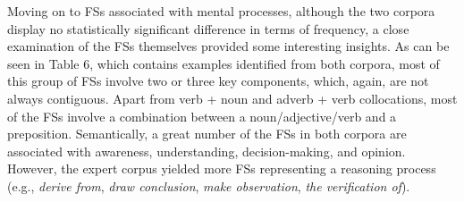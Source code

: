 \begin{styleStandard}
Moving on to FSs associated with mental processes, although the two corpora display no statistically significant difference in terms of frequency, a close examination of the FSs themselves provided some interesting insights. As can be seen in Table 6, which contains examples identified from both corpora, most of this group of FSs involve two or three key components, which, again, are not always contiguous. Apart from verb + noun and adverb + verb collocations, most of the FSs involve a combination between a noun/adjective/verb and a preposition. Semantically, a great number of the FSs in both corpora are associated with awareness, understanding, decision-making, and opinion. However, the expert corpus yielded more FSs representing a reasoning process (e.g., \textit{derive from}, \textit{draw conclusion}, \textit{make observation}, \textit{the verification of}).
\end{styleStandard}

